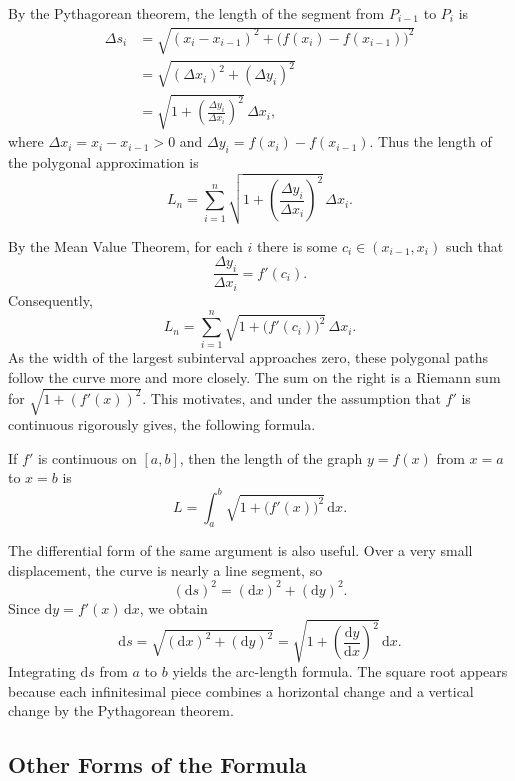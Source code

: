 By the Pythagorean theorem, the length of the segment from \(P_{i-1}\) to
\(P_i\) is
\begin{align*}
    \Delta s_i
    &=\sqrt{(x_i-x_{i-1})^2+
        \bigl(f(x_i)-f(x_{i-1})\bigr)^2} \\
    &=\sqrt{(\Delta x_i)^2+(\Delta y_i)^2} \\
    &=\sqrt{1+\left(\frac{\Delta y_i}{\Delta x_i}\right)^2}\,\Delta x_i,
\end{align*}
where \(\Delta x_i=x_i-x_{i-1}>0\) and
\(\Delta y_i=f(x_i)-f(x_{i-1})\).  Thus the length of the polygonal
approximation is
\[
    L_n=\sum_{i=1}^n
    \sqrt{1+\left(\frac{\Delta y_i}{\Delta x_i}\right)^2}\,\Delta x_i.
\]

By the Mean Value Theorem, for each \(i\) there is some
\(c_i\in(x_{i-1},x_i)\) such that
\[
    \frac{\Delta y_i}{\Delta x_i}=f'(c_i).
\]
Consequently,
\[
    L_n=\sum_{i=1}^n\sqrt{1+\bigl(f'(c_i)\bigr)^2}\,\Delta x_i.
\]
As the width of the largest subinterval approaches zero, these polygonal
paths follow the curve more and more closely.  The sum on the right is a
Riemann sum for \(\sqrt{1+(f'(x))^2}\).  This motivates, and under the
assumption that \(f'\) is continuous rigorously gives, the following
formula.

\begin{theorem}
    If \(f'\) is continuous on \([a,b]\), then the length of the graph
    \(y=f(x)\) from \(x=a\) to \(x=b\) is
    \[
        L=\int_a^b\sqrt{1+\bigl(f'(x)\bigr)^2}\,\mathrm{d}x.
    \]
\end{theorem}

The differential form of the same argument is also useful.  Over a very
small displacement, the curve is nearly a line segment, so
\[
    (\mathrm{d}s)^2=(\mathrm{d}x)^2+(\mathrm{d}y)^2.
\]
Since \(\mathrm{d}y=f'(x)\,\mathrm{d}x\), we obtain
\[
    \mathrm{d}s
    =\sqrt{(\mathrm{d}x)^2+(\mathrm{d}y)^2}
    =\sqrt{1+\left(\frac{\mathrm{d}y}{\mathrm{d}x}\right)^2}\,\mathrm{d}x.
\]
Integrating \(\mathrm{d}s\) from \(a\) to \(b\) yields the arc-length
formula.  The square root appears because each infinitesimal piece combines
a horizontal change and a vertical change by the Pythagorean theorem.

\subsection{Other Forms of the Formula}

